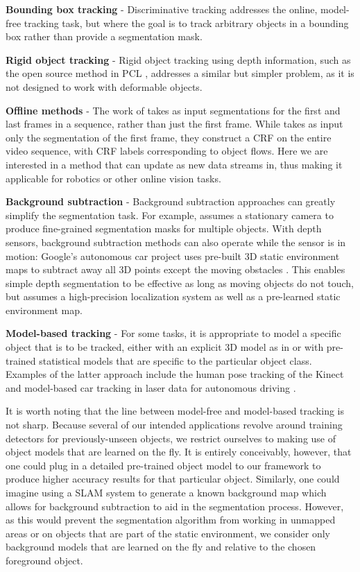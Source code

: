\documentclass[graybox]{svmult}
\begin{document}
\textbf{Bounding box tracking} - Discriminative tracking \cite{grabner2006a, stalder2009a, kalal2010a} addresses the online, model-free tracking task, but where the goal is to track arbitrary objects in a bounding box rather than provide a segmentation mask.

\textbf{Rigid object tracking} - Rigid object tracking using depth information, such as the open source method in PCL \cite{rusu2011a}, addresses a similar but simpler problem, as it is not designed to work with deformable objects.

\textbf{Offline methods} - The work of \cite{budvytis2011a} takes as input segmentations for the first and last frames in a sequence, rather than just the first frame.  While \cite{tsai2010a} takes as input only the segmentation of the first frame, they construct a CRF on the entire video sequence, with CRF labels corresponding to object flows.  Here we are interested in a method that can update as new data streams in, thus making it applicable for robotics or other online vision tasks.

\textbf{Background subtraction} - Background subtraction approaches can greatly simplify the segmentation task.  For example, \cite{aeschliman2010a} assumes a stationary camera to produce fine-grained segmentation masks for multiple objects.  With depth sensors, background subtraction methods can also operate while the sensor is in motion: Google's autonomous car project uses pre-built 3D static environment maps to subtract away all 3D points except the moving obstacles \cite{urmson2011a}.  This enables simple depth segmentation to be effective as long as moving objects do not touch, but assumes a high-precision localization system as well as a pre-learned static environment map.

\textbf{Model-based tracking} - For some tasks, it is appropriate to model a specific object that is to be tracked, either with an explicit 3D model as in \cite{prisacariu2009a} or with pre-trained statistical models that are specific to the particular object class.  Examples of the latter approach include the human pose tracking of the Kinect \cite{shotton2011a} and model-based car tracking in laser data for autonomous driving \cite{petrovskaya2009a}.

It is worth noting that the line between model-free and model-based tracking is not sharp.  Because several of our intended applications revolve around training detectors for previously-unseen objects, we restrict ourselves to making use of object models that are learned on the fly.  It is entirely conceivably, however, that one could plug in a detailed pre-trained object model to our framework to produce higher accuracy results for that particular object.  Similarly, one could imagine using a SLAM system to generate a known background map which allows for background subtraction to aid in the segmentation process.  However, as this would prevent the segmentation algorithm from working in unmapped areas or on objects that are part of the static environment, we consider only background models that are learned on the fly and relative to the chosen foreground object.
\end{document}
